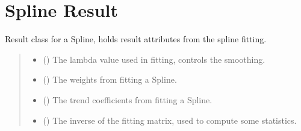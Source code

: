 \documentclass[letterpaper,10pt,english]{sphinxmanual}
\begin{document}
\section{Spline Result}
\label{\detokenize{splines:spline-result}}

\begin{fulllineitems}
\label{\detokenize{splines:glomar_gridding.spline.SplineResult}}
\pysigstartsignatures
\pysiglinewithargsret
{}
{\sphinxparamcomma {}\sphinxparamcomma {}\sphinxparamcomma {}\sphinxparamcomma {}\sphinxparamcomma {}\sphinxparamcomma {}}
{}
\pysigstopsignatures
\sphinxAtStartPar
Result class for a Spline, holds result attributes from the spline fitting.
\begin{quote}\begin{description}
\begin{itemize}
\item {}
\sphinxAtStartPar
{} () \textendash{} The lambda value used in fitting, controls the smoothing.

\item {}
\sphinxAtStartPar
{} () \textendash{} The weights from fitting a Spline.

\item {}
\sphinxAtStartPar
{} () \textendash{} The trend coefficients from fitting a Spline.

\item {}
\sphinxAtStartPar
{} () \textendash{} The inverse of the fitting matrix, used to compute some statistics.


\end{itemize}
\end{description}
\end{quote}
\end{fulllineitems}
\end{document}
